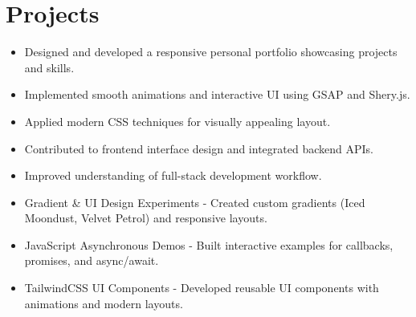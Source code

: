 \documentclass[11pt]{deedy-resume-openfont}
\begin{document}
\begin{minipage}[t]{0.61\textwidth} 

\section{Projects}
\descript{}
\begin{itemize}[leftmargin=*]
\item Designed and developed a responsive personal portfolio showcasing projects and skills.
\item Implemented smooth animations and interactive UI using GSAP and Shery.js.
\item Applied modern CSS techniques for visually appealing layout.
\end{itemize}
\sectionsep

\descript{}
\begin{itemize}[leftmargin=*]
\item Contributed to frontend interface design and integrated backend APIs.
\item Improved understanding of full-stack development workflow.
\end{itemize}
\sectionsep

\descript{}
\begin{itemize}[leftmargin=*]
\item Gradient & UI Design Experiments - Created custom gradients (Iced Moondust, Velvet Petrol) and responsive layouts.
\item JavaScript Asynchronous Demos - Built interactive examples for callbacks, promises, and async/await.
\item TailwindCSS UI Components - Developed reusable UI components with animations and modern layouts.
\end{itemize}
\sectionsep


\end{minipage}
\end{document}
